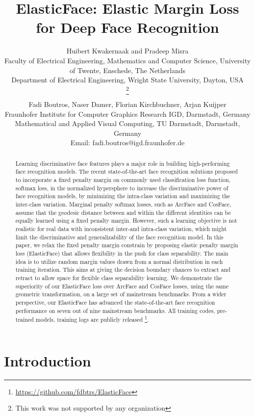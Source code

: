 \documentclass[letterpaper, 10 pt, conference]{ieeeconf}  \usepackage{times}
\title{\LARGE \bf
ElasticFace: Elastic Margin Loss for Deep Face Recognition}
\author{\parbox{16cm}{\centering
    {\large Huibert Kwakernaak and Pradeep Misra}\\
    {\normalsize
     Faculty of Electrical Engineering, Mathematics and Computer Science, University of Twente, Enschede, The Netherlands\\
     Department of Electrical Engineering, Wright State University, Dayton, USA}}
    \thanks{This work was not supported by any organization}}
\begin{document}
\author{Fadi Boutros, Naser Damer, 
Florian Kirchbuchner, Arjan Kuijper\\
Fraunhofer Institute for Computer Graphics Research IGD,
Darmstadt, Germany\\
Mathematical and Applied Visual Computing, TU Darmstadt,
Darmstadt, Germany\\
 Email: {fadi.boutros@igd.fraunhofer.de}
}
\pagestyle{plain}
\maketitle

\begin{abstract}
Learning discriminative face features plays a major role in building high-performing face recognition models. The recent state-of-the-art face recognition solutions proposed to incorporate a fixed penalty margin on commonly used classification loss function, softmax loss, in the normalized hypersphere to increase the discriminative power of face recognition models, by minimizing the intra-class variation and maximizing the inter-class variation. Marginal penalty softmax losses, such as ArcFace and CosFace, assume that the geodesic distance between and within the different identities can be equally learned using a fixed penalty margin. However, such a learning objective is not realistic for real data with inconsistent inter-and intra-class variation, which might limit the discriminative and generalizability of the face recognition model. In this paper, we relax the fixed penalty margin constrain by proposing elastic penalty margin loss (ElasticFace) that allows flexibility in the push for class separability. The main idea is to utilize random margin values drawn from a normal distribution in each training iteration. 
This aims at giving the decision boundary chances to extract and retract to allow space for flexible class separability learning. 
We demonstrate the superiority of our ElasticFace loss over ArcFace and CosFace losses, using the same geometric transformation, on a large set of mainstream benchmarks. From a wider perspective, our ElasticFace has advanced the state-of-the-art face recognition performance on seven out of nine mainstream benchmarks. All training codes, pre-trained models, training logs are publicly released \footnote{
\url{https://github.com/fdbtrs/ElasticFace}}.
\end{abstract}

\section{Introduction}
\end{document}
